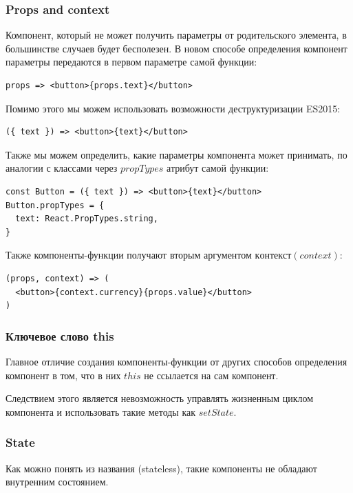 \subsubsection*{Props and context}

Компонент, который не может получить параметры от родительского элемента, в большинстве случаев будет бесполезен. В новом способе определения компонент параметры передаются в первом параметре самой функции:

\begin{lstlisting}
props => <button>{props.text}</button>
\end{lstlisting}

Помимо этого мы можем использовать возможности деструктуризации ES2015:

\begin{lstlisting}
({ text }) => <button>{text}</button>
\end{lstlisting}

Также мы можем определить, какие параметры компонента может принимать, по аналогии с классами через $propTypes$ атрибут самой функции:

\begin{lstlisting}
const Button = ({ text }) => <button>{text}</button>
Button.propTypes = {
  text: React.PropTypes.string,
}
\end{lstlisting}

Также компоненты-функции получают вторым аргументом $контекст (context)$:

\begin{lstlisting}
(props, context) => (
  <button>{context.currency}{props.value}</button>
)
\end{lstlisting}

\subsubsection*{Ключевое слово this}

Главное отличие создания компоненты-функции от других способов определения компонент в том, что в них $this$ не ссылается на сам компонент.

Следствием этого является невозможность управлять жизненным циклом компонента и использовать такие методы как $setState$.

\subsubsection*{State}

Как можно понять из названия (stateless), такие компоненты не обладают внутренним состоянием. 

